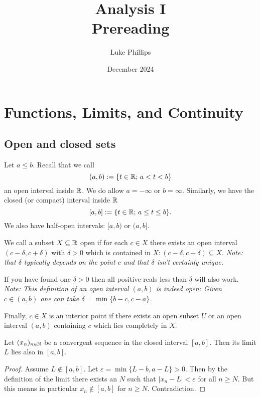 \documentclass[10pt, a4paper]{article}
\title{Analysis I \\
    \large Prereading}
\author{Luke Phillips}
\date{December 2024}
\newcommand{\seq}[1][x]{(#1_n)_{n \in \N}}
\begin{document}
\maketitle

\newpage

\tableofcontents

\newpage

\section{Functions, Limits, and Continuity}

\subsection{Open and closed sets}
Let $a \leq b$.
Recall that we call
\[
(a, b) := \{t \in \mathbb{R};\,a < t < b\}
\]
an open interval inside $\mathbb{R}$.
We do allow $a = -\infty$ or $b = \infty$.
Similarly,
we have the closed
(or compact)
interval inside $\mathbb{R}$
\[
[a, b] := \{t \in \mathbb{R};\, a \leq t \leq b\}.
\]
We also have half-open intervals:
$[a, b)$ or $(a, b]$.

We call a subset $X \subseteq \mathbb{R}$ open if for each $c \in X$ there exists an open interval $(c - \delta, c + \delta)$ with $\delta > 0$ which is contained in $X : (c - \delta, c + \delta) \subseteq X$.
\textit{Note:
that $\delta$ typically depends on the point $c$ and that $\delta$ isn't certainly unique.}

If you have found one $\delta > 0$ then all positive reals less than $\delta$ will also work.
\textit{Note:
This definition of an open interval $(a, b)$ is indeed open:
Given $c \in (a, b)$ one can take $\delta = \min\{b - c, c - a\}$.}

Finally,
$c \in X$ is an interior point if there exists an open subset $U$ or an open interval $(a, b)$ containing $c$ which lies completely in $X$.

\hfill

\begin{lemma}\label{pre:analy:lem:limofconvseqinclosedintinint}
    Let $\seq$ be a convergent sequence in the closed interval $[a, b]$.
    Then its limit $L$ lies also in $[a, b]$.
    \begin{proof}
        Assume $L \notin [a, b]$.
        Let $\varepsilon = \min\{L - b, a - L\} > 0$.
        Then by the definition of the limit there exists an $N$ such that $|x_n - L| < \varepsilon$ for all $n \geq N$.
        But this means in particular $x_n \notin [a, b]$ for $n \geq N$.
        Contradiction.
    \end{proof}
\end{lemma}
\begin{center}
\end{center}
\hfill
\end{document}
